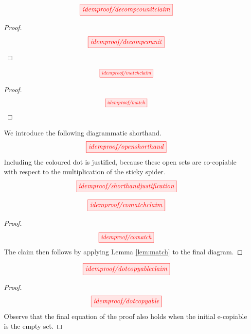 \begin{myboxB}
\begin{proposition}\label{prop:decompcounit}
\[\scalebox{1}{\tikzfig{idemproof/decompcounitclaim}}\]
\begin{proof}
\[\scalebox{1}{\tikzfig{idemproof/decompcounit}}\]
\end{proof}
\end{proposition}
\end{myboxB}

\begin{myboxR}
\begin{lemma}\label{lem:match}
\[\scalebox{0.75}{\tikzfig{idemproof/matchclaim}}\]
\begin{proof}
\[\scalebox{0.75}{\tikzfig{idemproof/match}}\]
\end{proof}
\end{lemma}
\end{myboxR}

\begin{myboxB}
\begin{convention}
We introduce the following diagrammatic shorthand.
\[\scalebox{1}{\tikzfig{idemproof/openshorthand}}\]
Including the coloured dot is justified, because these open sets are co-copiable with respect to the multiplication of the sticky spider.
\[\scalebox{1}{\tikzfig{idemproof/shorthandjustification}}\]
\end{convention}
\end{myboxB}

\begin{myboxR}
\begin{lemma}[Co-match]\label{lem:comatch}
\[\scalebox{1}{\tikzfig{idemproof/comatchclaim}}\]
\begin{proof}
\[\scalebox{0.9}{\tikzfig{idemproof/comatch}}\]
The claim then follows by applying Lemma \ref{lem:match} to the final diagram.
\end{proof}
\end{lemma}
\end{myboxR}

\begin{myboxB}
\begin{lemma}\label{lem:ecopyfixpoint}
\[\scalebox{1}{\tikzfig{idemproof/dotcopyableclaim}}\]
\begin{proof}
\[\scalebox{1}{\tikzfig{idemproof/dotcopyable}}\]
Observe that the final equation of the proof also holds when the initial e-copiable is the empty set.
\end{proof}
\end{lemma}
\end{myboxB}

